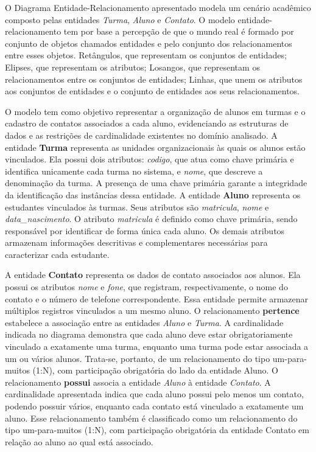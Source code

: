 \documentclass[12pt,a4paper,openright]{book}
\begin{document}
O Diagrama Entidade-Relacionamento apresentado modela um cenário acadêmico composto pelas entidades \textit{Turma}, \textit{Aluno} e \textit{Contato}. O modelo entidade-relacionamento tem por base a percepção de que o mundo real é formado por conjunto de objetos chamados entidades e pelo conjunto dos relacionamentos entre esses objetos. Retângulos, que representam os conjuntos de entidades; Elipses, que representam os atributos; Losangos, que representam os relacionamentos entre os conjuntos de entidades; Linhas, que unem os atributos aos conjuntos de entidades e o conjunto de entidades aos seus relacionamentos.

O modelo tem como objetivo representar a organização de alunos em turmas e o cadastro de contatos associados a cada aluno, evidenciando as estruturas de dados e as restrições de cardinalidade existentes no domínio analisado. A entidade \textbf{Turma} representa as unidades organizacionais às quais os alunos estão vinculados. Ela possui dois atributos: \textit{codigo}, que atua como chave primária e identifica unicamente cada turma no sistema, e \textit{nome}, que descreve a denominação da turma. A presença de uma chave primária garante a integridade da identificação das instâncias dessa entidade. A entidade \textbf{Aluno} representa os estudantes vinculados às turmas. Seus atributos são \textit{matricula}, \textit{nome} e \textit{data\_nascimento}. O atributo \textit{matricula} é definido como chave primária, sendo responsável por identificar de forma única cada aluno. Os demais atributos armazenam informações descritivas e complementares necessárias para caracterizar cada estudante.

A entidade \textbf{Contato} representa os dados de contato associados aos alunos. Ela possui os atributos \textit{nome} e \textit{fone}, que registram, respectivamente, o nome do contato e o número de telefone correspondente. Essa entidade permite armazenar múltiplos registros vinculados a um mesmo aluno. O relacionamento \textbf{pertence} estabelece a associação entre as entidades \textit{Aluno} e \textit{Turma}. A cardinalidade indicada no diagrama demonstra que cada aluno deve estar obrigatoriamente vinculado a exatamente uma turma, enquanto uma turma pode estar associada a um ou vários alunos. Trata-se, portanto, de um relacionamento do tipo um-para-muitos (1:N), com participação obrigatória do lado da entidade Aluno. O relacionamento \textbf{possui} associa a entidade \textit{Aluno} à entidade \textit{Contato}. A cardinalidade apresentada indica que cada aluno possui pelo menos um contato, podendo possuir vários, enquanto cada contato está vinculado a exatamente um aluno. Esse relacionamento também é classificado como um relacionamento do tipo um-para-muitos (1:N), com participação obrigatória da entidade Contato em relação ao aluno ao qual está associado.
\end{document}
